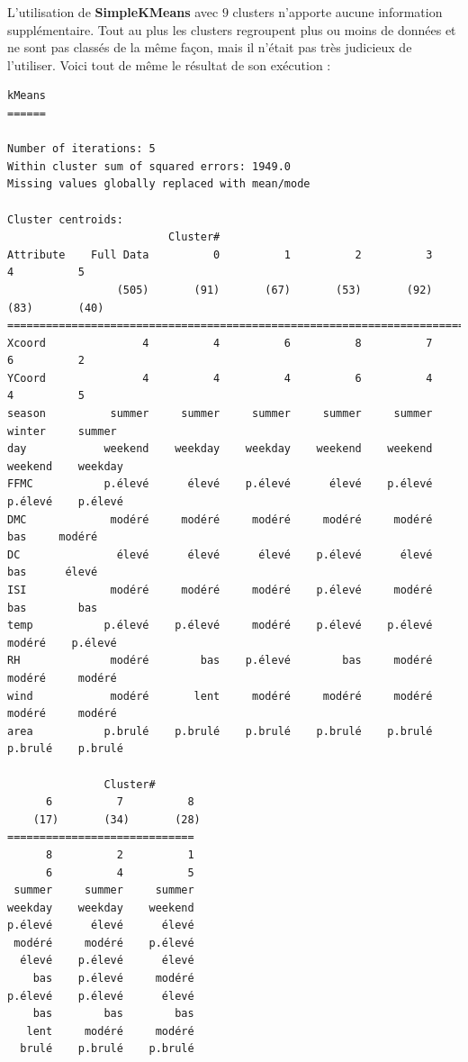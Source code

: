 \documentclass{article}
\begin{document}
\begin{sffamily}
L'utilisation de \textbf{SimpleKMeans} avec $9$ clusters n'apporte aucune information supplémentaire. Tout au plus les clusters 
regroupent plus ou moins de données et ne sont pas classés de la même façon, mais il n'était pas très judicieux de l'utiliser. Voici tout 
de même le résultat de son exécution : \\

\begin{center}
	\begin{verbatim}
kMeans
======

Number of iterations: 5
Within cluster sum of squared errors: 1949.0
Missing values globally replaced with mean/mode

Cluster centroids:
                         Cluster#
Attribute    Full Data          0          1          2          3          4          5
                 (505)       (91)       (67)       (53)       (92)       (83)       (40)
========================================================================================
Xcoord               4          4          6          8          7          6          2
YCoord               4          4          4          6          4          4          5
season          summer     summer     summer     summer     summer     winter     summer
day            weekend    weekday    weekday    weekend    weekend    weekend    weekday
FFMC           p.élevé      élevé    p.élevé      élevé    p.élevé    p.élevé    p.élevé
DMC             modéré     modéré     modéré     modéré     modéré        bas     modéré
DC               élevé      élevé      élevé    p.élevé      élevé        bas      élevé
ISI             modéré     modéré     modéré    p.élevé     modéré        bas        bas
temp           p.élevé    p.élevé     modéré    p.élevé    p.élevé     modéré    p.élevé
RH              modéré        bas    p.élevé        bas     modéré     modéré     modéré
wind            modéré       lent     modéré     modéré     modéré     modéré     modéré
area           p.brulé    p.brulé    p.brulé    p.brulé    p.brulé    p.brulé    p.brulé

               Cluster#
      6          7          8
    (17)       (34)       (28)
=============================
      8          2          1
      6          4          5
 summer     summer     summer
weekday    weekday    weekend
p.élevé      élevé      élevé
 modéré     modéré    p.élevé
  élevé    p.élevé      élevé
    bas    p.élevé     modéré
p.élevé    p.élevé      élevé
    bas        bas        bas
   lent     modéré     modéré
  brulé    p.brulé    p.brulé



\end{verbatim}
\end{center}
\end{sffamily}
\end{document}
